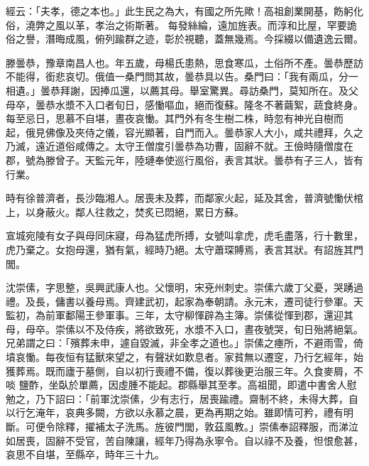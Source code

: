 
\begin{pinyinscope}

 經云：「夫孝，德之本也。」此生民之為大，有國之所先歟！高祖創業開基，飭躬化俗，澆弊之風以革，孝治之術斯著。
 每發絲綸，遠加旌表。而淳和比屋，罕要詭俗之譽，潛晦成風，俯列踰群之迹，彰於視聽，蓋無幾焉。今採綴以備遺逸云爾。



 滕曇恭，豫章南昌人也。年五歲，母楊氏患熱，思食寒瓜，土俗所不產。曇恭歷訪不能得，銜悲哀切。俄值一桑門問其故，曇恭具以告。桑門曰：「我有兩瓜，分一相遺。」曇恭拜謝，因捧瓜還，以薦其母。舉室驚異。尋訪桑門，莫知所在。及父母卒，曇恭水漿不入口者旬日，感慟嘔血，絕而復蘇。隆冬不著繭絮，蔬食終身。每至忌日，思慕不自堪，晝夜哀慟。其門外有冬生樹二株，時忽有神光自樹而
 起，俄見佛像及夾侍之儀，容光顯著，自門而入。曇恭家人大小，咸共禮拜，久之乃滅，遠近道俗咸傳之。太守王僧度引曇恭為功曹，固辭不就。王儉時隨僧度在郡，號為滕曾子。天監元年，陸璉奉使巡行風俗，表言其狀。曇恭有子三人，皆有行業。



 時有徐普濟者，長沙臨湘人。居喪未及葬，而鄰家火起，延及其舍，普濟號慟伏棺上，以身蔽火。鄰人往救之，焚炙已悶絕，累日方蘇。



 宣城宛陵有女子與母同床寢，母為猛虎所搏，女號叫拿虎，虎毛盡落，行十數里，虎乃棄之。女抱母還，猶有氣，經時乃絕。太守蕭琛賻焉，表言其狀。有詔旌其門閭。



 沈崇傃，字思整，吳興武康人也。父懷明，宋兗州刺史。崇傃六歲丁父憂，哭踴過禮。及長，傭書以養母焉。齊建武初，起家為奉朝請。永元末，遷司徒行參軍。天監初，為前軍鄱陽王參軍事。三年，太守柳惲辟為主簿。崇傃從惲到郡，還迎其母，母卒。崇傃以不及侍疾，將欲致死，水漿不入口，晝夜號哭，旬日殆將絕氣。兄弟謂之曰：「殯葬未申，遽自毀滅，非全孝之道也。」崇傃之瘞所，不避雨雪，倚墳哀慟。每夜恒有猛獸來望之，有聲狀如歎息者。家貧無以遷窆，乃行乞經年，始獲葬焉。既而廬于墓側，自以初行喪禮不備，復以葬後更治服三年。久食麥屑，不啖
 鹽酢，坐臥於單薦，因虛腫不能起。郡縣舉其至孝。高祖聞，即遣中書舍人慰勉之，乃下詔曰：「前軍沈崇傃，少有志行，居喪踰禮。齋制不終，未得大葬，自以行乞淹年，哀典多闕，方欲以永慕之晨，更為再期之始。雖即情可矜，禮有明斷。可便令除釋，擢補太子洗馬。旌彼門閭，敦茲風教。」崇傃奉詔釋服，而涕泣如居喪，固辭不受官，苦自陳讓，經年乃得為永寧令。自以祿不及養，怛恨愈甚，哀思不自堪，至縣卒，時年三十九。




\end{pinyinscope}
